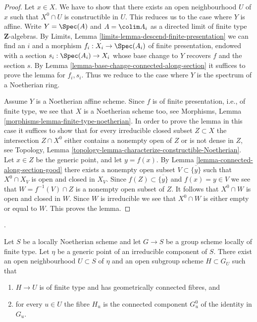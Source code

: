 \begin{proof}
Let $x \in X$. We have to show that there exists an open neighbourhood
$U$ of $x$ such that $X^0 \cap U$ is constructible in $U$.
This reduces us to the case where $Y$ is affine.
Write $Y = \Spec(A)$ and $A = \colim A_i$ as a directed
limit of finite type $\mathbf{Z}$-algebras. By
Limits, Lemma \ref{limits-lemma-descend-finite-presentation}
we can find an $i$ and a morphism $f_i : X_i \to \Spec(A_i)$ of
finite presentation, endowed with a section $s_i : \Spec(A_i) \to X_i$
whose base change to $Y$ recovers $f$ and the section $s$. By
Lemma \ref{lemma-base-change-connected-along-section}
it suffices to prove the lemma for $f_i, s_i$. Thus we reduce to
the case where $Y$ is the spectrum of a Noetherian ring.

\medskip\noindent
Assume $Y$ is a Noetherian affine scheme. Since $f$ is of finite presentation,
i.e., of finite type, we see that $X$ is a Noetherian scheme too, see
Morphisms, Lemma \ref{morphisms-lemma-finite-type-noetherian}.
In order to prove the lemma in
this case it suffices to show that for every irreducible closed subset
$Z \subset X$ the intersection $Z \cap X^0$ either contains a nonempty
open of $Z$ or is not dense in $Z$, see
Topology, Lemma \ref{topology-lemma-characterize-constructible-Noetherian}.
Let $x \in Z$ be the generic point, and let $y = f(x)$. By
Lemma \ref{lemma-connected-along-section-good}
there exists a nonempty open subset $V \subset \overline{\{y\}}$ such
that $X^0 \cap X_V$ is open and closed in $X_V$. Since
$f(Z) \subset \overline{\{y\}}$ and $f(x) = y \in V$ we see that
$W = f^{-1}(V) \cap Z$ is a nonempty open subset of $Z$. It follows that
$X^0 \cap W$ is open and closed in $W$. Since $W$ is irreducible
we see that $X^0 \cap W$ is either empty or equal to $W$.
This proves the lemma.
\end{proof}

\begin{lemma}
\label{lemma-identity-component-generic-open-subgroup}
\begin{reference}
\cite[Expos\'e 236, Lemma 1.2, pp. 224--225]{FGA}.
\end{reference}
Let $S$ be a locally Noetherian scheme and let $G \to S$ be a group scheme
locally of finite type. Let $\eta$ be a generic point of an irreducible
component of $S$. There exist an open neighbourhood $U \subset S$ of
$\eta$ and an open subgroup scheme $H \subset G_U$ such that
\begin{enumerate}
\item $H \to U$ is of finite type and has geometrically connected fibres,
and
\item for every $u \in U$ the fibre $H_u$ is the connected component
$G_u^0$ of the identity in $G_u$.
\end{enumerate}
\end{lemma}

